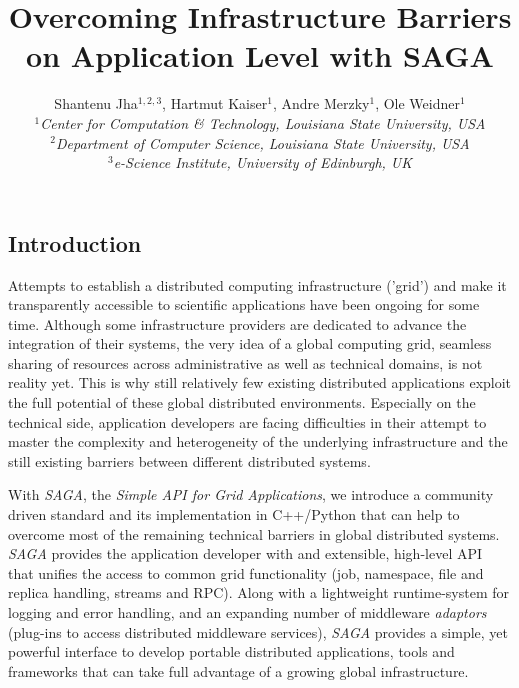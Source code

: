 \documentclass[a4paper,10pt]{article}
\newcommand{\sagaimpl}{\textit{SAGA}\xspace}
\newcommand{\impl}{\sagaimpl}
\newcommand{\jhanote}[1]{  {\textcolor{red}     { ***Shantenu: #1 }}}
\newcommand{\jhanote}[1]{}
\begin{document}
 \title{ \Large \vspace{-3.5em} Overcoming Infrastructure Barriers on Application Level with SAGA }
 
 \author{Shantenu Jha$^{1,2,3}$, Hartmut Kaiser$^{1}$, Andre Merzky$^{1}$, Ole Weidner$^{1}$ \\
   \small{\emph{$^{1}$Center for Computation \& Technology, Louisiana State University, USA}}\\
   \small{\emph{$^{2}$Department of Computer Science, Louisiana State University, USA}}\\
   \small{\emph{$^{3}$e-Science Institute, University of Edinburgh, UK}}
 }
 \date{}
 \maketitle
 




\subsection*{Introduction}
\vspace{-0.5em}

 Attempts to establish a distributed computing infrastructure ('grid')
 and make it transparently accessible to scientific applications have
 been ongoing for some time. Although some infrastructure providers
 are dedicated to advance the integration of their systems, the very
 idea of a global computing grid, seamless sharing of resources across
 administrative as well as technical domains, is not reality yet. This
 is why still relatively few existing distributed applications exploit
 the full potential of these global distributed environments.
 Especially on the technical side, application developers are facing
 difficulties in their attempt to master the complexity and
 heterogeneity of the underlying infrastructure and the still existing
 barriers between different distributed systems.

 With \impl, the \textit{Simple API for Grid Applications}, we
 introduce a community driven standard and its implementation in
 C++/Python that can help to overcome most of the remaining technical
 barriers in global distributed systems. \impl provides the
 application developer with and extensible, high-level API that
 unifies the access to common grid functionality (job, namespace, file
 and replica handling, streams and RPC). Along with a lightweight
 runtime-system for logging and error handling, and an expanding
 number of middleware \textit{adaptors} (plug-ins to access
 distributed middleware services), \impl provides a simple, yet
 powerful interface to develop portable distributed applications,
 tools and frameworks that can take full advantage of a growing global
 infrastructure.
\end{document}
